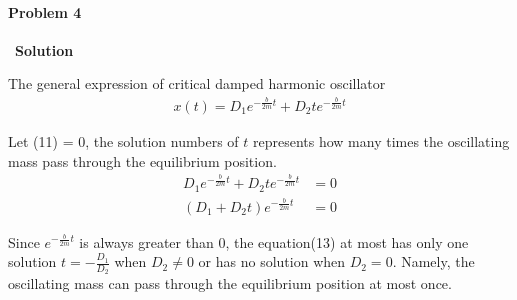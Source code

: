\documentclass[12pt,a4paper]{article}
\begin{document}
\paragraph{\large \textbf{Problem 4}}~{\textbf{Solution}}
\vspace{2mm}
\par The general expression of critical damped harmonic oscillator
\begin{align}
	x(t) = D_1e^{-\frac{b}{2m}t} + D_2te^{-\frac{b}{2m}t}
\end{align}
\par Let (11) = 0, the solution numbers of $t$ represents how many times the oscillating mass pass through the equilibrium position.
\begin{align}
	D_1e^{-\frac{b}{2m}t} + D_2te^{-\frac{b}{2m}t} &= 0\\
	(D_1 + D_2t)e^{-\frac{b}{2m}t} &= 0
\end{align}
\par Since $e^{-\frac{b}{2m}t}$ is always greater than 0, the equation(13) at most has only one solution $t = -\frac{D_1}{D_2}$ when $D_2 \neq 0$ or has no solution when $D_2 = 0$. Namely, the oscillating mass can pass through the equilibrium position at most once.
\end{document}

